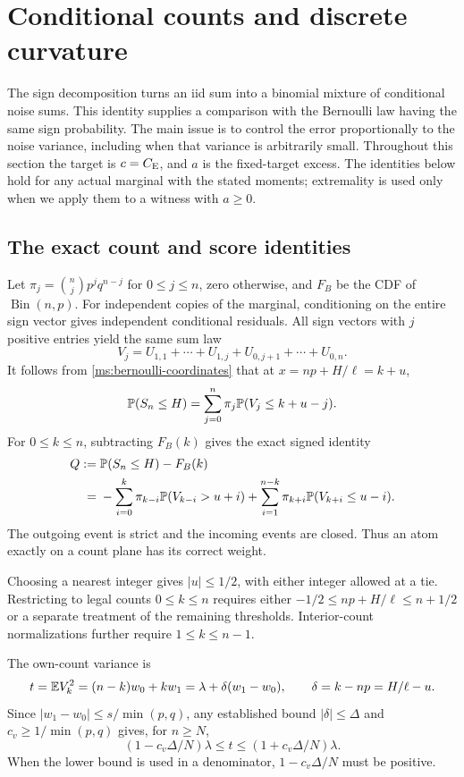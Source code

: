 \section{Conditional counts and discrete curvature}\label{ms:counts}
The sign decomposition turns an iid sum into a binomial mixture of
conditional noise sums. This identity supplies a comparison with the
Bernoulli law having the same sign probability. The main issue is to
control the error proportionally to the noise variance, including when
that variance is arbitrarily small. Throughout this section the target is
$c=C_{\mathrm E}$, and $a$ is the fixed-target excess. The identities below hold for
any actual marginal with the stated moments; extremality is used only when
we apply them to a witness with $a\ge0$.

\subsection{The exact count and score identities}

Let $\pi_j=\binom njp^jq^{n-j}$ for $0\le j\le n$, zero otherwise,
and $F_B$ be the CDF of $\operatorname{Bin}(n,p)$. For independent copies
of the marginal, conditioning on the entire sign vector gives independent
conditional residuals. All sign vectors with $j$ positive entries yield
the same sum law
\[
 V_j=U_{1,1}+\cdots+U_{1,j}+U_{0,j+1}+\cdots+U_{0,n}.
\]
It follows from \eqref{ms:bernoulli-coordinates} that at
$x=np+H/\ell=k+u$,
\begin{equation}
 \mathbb P(S_n\le H)=\sum_{j=0}^n\pi_j\mathbb P(V_j\le k+u-j).
\label{ms:count-identity}
\end{equation}
For $0\le k\le n$, subtracting $F_B(k)$ gives the exact signed identity
\begin{align}
 Q:={}&\mathbb P(S_n\le H)-F_B(k)\notag\\
   ={}&-\sum_{i=0}^{k}\pi_{k-i}\mathbb P(V_{k-i}>u+i)
      +\sum_{i=1}^{n-k}\pi_{k+i}\mathbb P(V_{k+i}\le u-i).
\label{ms:count-difference}
\end{align}
The outgoing event is strict and the incoming events are closed. Thus an
atom exactly on a count plane has its correct weight.

Choosing a nearest integer gives $|u|\le1/2$, with either integer allowed
at a tie. Restricting to legal counts $0\le k\le n$ requires either
$-1/2\le np+H/\ell\le n+1/2$ or a separate treatment of the remaining
thresholds. Interior-count normalizations further require $1\le k\le n-1$.

The own-count variance is
\[
 t=\mathbb E V_k^2=(n-k)w_0+kw_1=\lambda+\delta(w_1-w_0),\qquad
 \delta=k-np=H/\ell-u.
\]
Since $|w_1-w_0|\le s/\min(p,q)$, any established bound
$|\delta|\le\Delta$ and $c_v\ge1/\min(p,q)$ gives, for $n\ge N$,
\begin{equation}
 (1-c_v\Delta/N)\lambda\le t\le(1+c_v\Delta/N)\lambda.
\label{ms:own-count-variance}
\end{equation}
When the lower bound is used in a denominator, $1-c_v\Delta/N$ must be positive.


